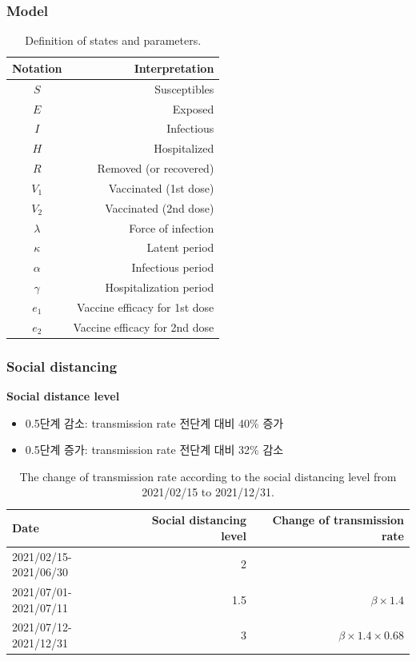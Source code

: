 \documentclass[aspectratio=169, 9pt, xcolor=dvipsnames]{beamer}
\begin{document}
	\begin{frame}\frametitle{Model}
	    \begin{table}
	    	\begin{tabular}{cr}
	    		\toprule
	    		\textbf{Notation} & \textbf{Interpretation} \\
	    		\midrule
	    		$S$ & Susceptibles \\
	    		$E$ & Exposed \\
	    		$I$ & Infectious \\
	    		$H$ & Hospitalized \\
	    		$R$ & Removed (or recovered) \\
	    		$V_1$ & Vaccinated (1st dose) \\
	    		$V_2$ & Vaccinated (2nd dose) \\
	    		$\lambda$ & Force of infection \\
	    		$\kappa$ & Latent period \\
	    		$\alpha$ & Infectious period \\
	    		$\gamma$ & Hospitalization period \\
	    		$e_1$ & Vaccine efficacy for 1st dose \\
	    		$e_2$ & Vaccine efficacy for 2nd dose \\
	    		\bottomrule
	    	\end{tabular}
	    	\caption{Definition of states and parameters.}
	    \end{table}
	\end{frame}

	\begin{frame}\frametitle{Social distancing}
		\textbf{Social distance level}
		\begin{itemize}
			\item 0.5단계 감소: transmission rate 전단계 대비 40\% 증가
			\item 0.5단계 증가: transmission rate 전단계 대비 32\% 감소
		\end{itemize}
	    \begin{table}
	    	\begin{tabular}{lrr}
	    		\toprule
	    		\textbf{Date} & \textbf{Social distancing level} & \textbf{Change of transmission rate} \\
	    		\midrule
	    		2021/02/15-2021/06/30 & 2 &  \\
	    		2021/07/01-2021/07/11 & 1.5 & $\beta \times 1.4$ \\
	    		2021/07/12-2021/12/31\footnotemark[2] & 3 & $\beta \times 1.4 \times 0.68$ \\
	    		\bottomrule
	    	\end{tabular}
	    	\caption{The change of transmission rate according to the social distancing level from 2021/02/15 to 2021/12/31.}
	    \end{table}
	\end{frame}
\end{document}
